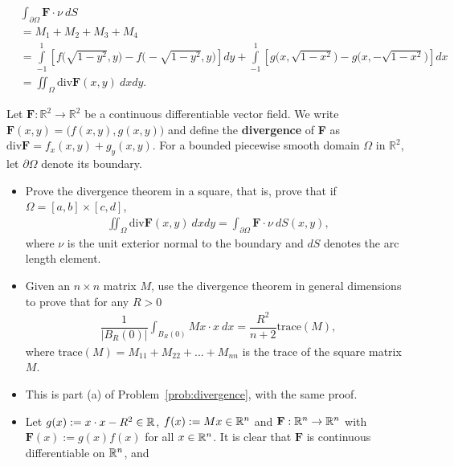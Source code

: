 \begin{problem}
\begin{solution}
\begin{enumerate}
\begin{align*}
        &\displaystyle\int_{\partial\Omega}\mathbf{F}\cdot \nu\ dS \\
        &= M_1 + M_2 + M_3 + M_4 \\
        &= \displaystyle\int\limits_{-1}^1 \left[ f\Big(\sqrt{1-y^2},y\Big) - f\Big( -\sqrt{1-y^2},y\Big) \right] dy + \displaystyle\int\limits_{-1}^1 \left[ g\Big(x,\sqrt{1-x^2}\Big) - g\Big(x, -\sqrt{1-x^2}\Big) \right] dx \\
        &= \displaystyle\iint_{\Omega}\mathrm{div}\mathbf{F}(x,y)\ dxdy.
    \end{align*}
\end{enumerate}
\end{solution}
\end{problem}

\begin{problem}
Let $\mathbf{F}: \mathbb{R}^2 \rightarrow \mathbb{R}^2$ be a continuous differentiable vector field. We write $\mathbf{F}(x,y) = \big( f(x,y), g(x,y)\big)$ and define the \textbf{divergence} of \textbf{F} as $\mathrm{div}\mathbf{F}=f_x (x,y) + g_y (x,y)$. For a bounded piecewise smooth domain $\Omega$ in $\mathbb{R}^2$, let $\partial\Omega$ denote its boundary.   
\begin{itemize}
    \item[(a)] Prove the divergence theorem in a square, that is, prove that if $\Omega = [a,b]\times [c,d]$,
    \begin{align}\label{f-2020-6a}
        \displaystyle\iint_{\Omega} \mathrm{div}\mathbf{F}(x,y)\ dx dy = \displaystyle\int_{\partial\Omega}\mathbf{F}\cdot \nu\ dS(x,y), 
    \end{align}
    where $\nu$ is the unit exterior normal to the boundary and $dS$ denotes the arc length element. 
    \item[(b)] Given an $n\times n$ matrix $M$, use the divergence theorem in general dimensions to prove that for any $R>0$ 
    \begin{align*}
        \dfrac{1}{\left|B_R(0)\right|}\displaystyle\int_{B_R(0)} M x \cdot x \ dx = \dfrac{R^2}{n+2}\mathrm{trace}(M),
    \end{align*}
    where $\mathrm{trace}(M) = M_{11} + M_{22} + ... + M_{nn}$ is the trace of the square matrix $M$.
\end{itemize}
\begin{solution}
\begin{itemize}
    \item[(a)] This is part (a) of Problem~\ref{prob:divergence}, with the same proof.
    \item[(b)] Let $g(x):= x \cdot x - R^2 \in \mathbb{R}$, $f(x) := Mx \in \mathbb{R}^n$ and $\mathbf{F}: \mathbb{R}^n \rightarrow \mathbb{R}^n$ with $\mathbf{F}(x):= g(x)f(x)$ for all $x\in \mathbb{R}^n$. It is clear that $\mathbf{F}$ is continuous differentiable on $\mathbb{R}^n$, and 

\end{itemize}
\end{solution}
\end{problem}

